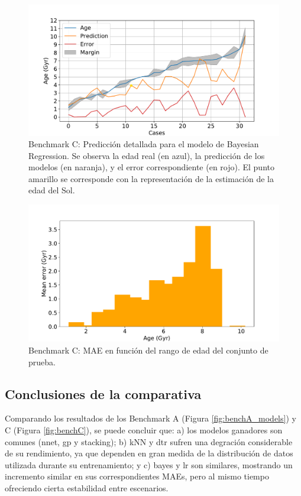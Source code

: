 \begin{figure}[H]
\begin{center}
 \includegraphics[width=0.8\linewidth]{Figuras/Experimentos/B_C_bayes_2.pdf}
\end{center}
\caption{Benchmark C: Predicción detallada para el modelo de Bayesian Regression. Se observa la edad real (en azul), la predicción de los modelos (en naranja), y el error correspondiente (en rojo). El punto amarillo se corresponde con la representación de la estimación de la edad del Sol.}
 \label{fig:benchC_details_bayes_2}
\end{figure}

\begin{figure}[H]
\begin{center}
 \includegraphics[width=0.8\linewidth]{Figuras/Experimentos/B_C_bayes_3.pdf}
\end{center}
\caption{Benchmark C: MAE en función del rango de edad del conjunto de prueba.}
 \label{fig:benchC_details_bayes_3}
\end{figure}

\subsection{Conclusiones de la comparativa}

Comparando los resultados de los Benchmark A (Figura \ref{fig:benchA_models}) y C (Figura \ref{fig:benchC}), se puede concluir que: %
a) los modelos ganadores son comunes (nnet, gp y stacking); b) kNN y dtr sufren una degración considerable de su rendimiento, ya que dependen en gran medida de la distribución de datos utilizada durante su entrenamiento; y c) bayes y lr son similares, mostrando un incremento similar en sus correspondientes MAEs, pero al mismo tiempo ofreciendo cierta estabilidad entre escenarios.

